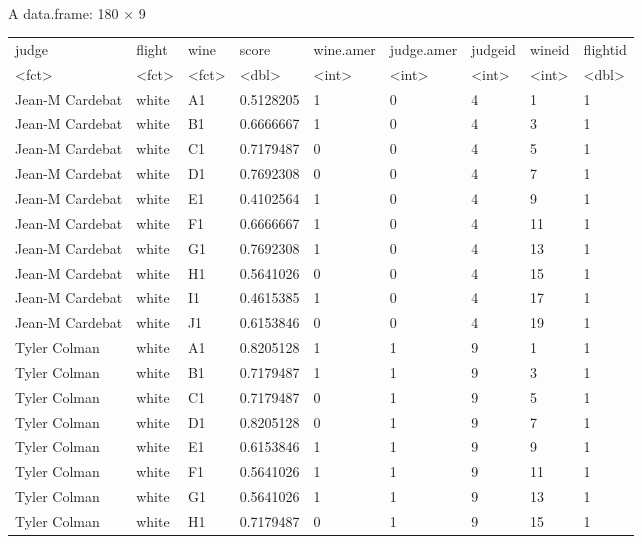 \documentclass[11pt]{article}
\begin{document}
    \begin{center}
    \end{center}
    { \hspace*{\fill} \\}
    
    A data.frame: 180 × 9
\begin{tabular}{lllllllll}
 judge & flight & wine & score & wine.amer & judge.amer & judgeid & wineid & flightid\\
 <fct> & <fct> & <fct> & <dbl> & <int> & <int> & <int> & <int> & <dbl>\\
\hline
	 Jean-M Cardebat & white & A1 & 0.5128205 & 1 & 0 & 4 &  1 & 1\\
	 Jean-M Cardebat & white & B1 & 0.6666667 & 1 & 0 & 4 &  3 & 1\\
	 Jean-M Cardebat & white & C1 & 0.7179487 & 0 & 0 & 4 &  5 & 1\\
	 Jean-M Cardebat & white & D1 & 0.7692308 & 0 & 0 & 4 &  7 & 1\\
	 Jean-M Cardebat & white & E1 & 0.4102564 & 1 & 0 & 4 &  9 & 1\\
	 Jean-M Cardebat & white & F1 & 0.6666667 & 1 & 0 & 4 & 11 & 1\\
	 Jean-M Cardebat & white & G1 & 0.7692308 & 1 & 0 & 4 & 13 & 1\\
	 Jean-M Cardebat & white & H1 & 0.5641026 & 0 & 0 & 4 & 15 & 1\\
	 Jean-M Cardebat & white & I1 & 0.4615385 & 1 & 0 & 4 & 17 & 1\\
	 Jean-M Cardebat & white & J1 & 0.6153846 & 0 & 0 & 4 & 19 & 1\\
	 Tyler Colman    & white & A1 & 0.8205128 & 1 & 1 & 9 &  1 & 1\\
	 Tyler Colman    & white & B1 & 0.7179487 & 1 & 1 & 9 &  3 & 1\\
	 Tyler Colman    & white & C1 & 0.7179487 & 0 & 1 & 9 &  5 & 1\\
	 Tyler Colman    & white & D1 & 0.8205128 & 0 & 1 & 9 &  7 & 1\\
	 Tyler Colman    & white & E1 & 0.6153846 & 1 & 1 & 9 &  9 & 1\\
	 Tyler Colman    & white & F1 & 0.5641026 & 1 & 1 & 9 & 11 & 1\\
	 Tyler Colman    & white & G1 & 0.5641026 & 1 & 1 & 9 & 13 & 1\\
	 Tyler Colman    & white & H1 & 0.7179487 & 0 & 1 & 9 & 15 & 1\\

\end{tabular}
\end{document}
